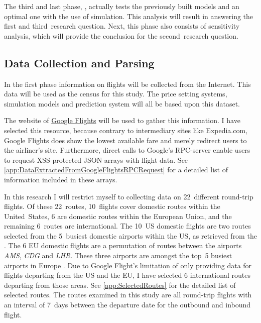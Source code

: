 The third and last phase, , actually tests the previously built models and an optimal one with the use of simulation. This analysis will result in answering the first and third~research question. Next, this phase also consists of sensitivity analysis, which will provide the conclusion for the second~research question.

\subsection{Data Collection and Parsing}
\label{subsec:DataCollectionAndParsing}
In the first phase information on flights will be collected from the Internet. This data will be used as the census for this study. The price setting systems, simulation models and prediction system will all be based upon this dataset.

The website of \href{http://google.nl/flights}{Google Flights} will be used to gather this information. I have selected this resource, because contrary to intermediary sites like Expedia.com, Google Flights does show the lowest available fare and merely redirect users to the airliner's site. Furthermore, direct calls to Google's RPC-server enable users to request XSS-protected JSON-arrays with flight data. See \autoref{app:DataExtractedFromGoogleFlightsRPCRequest} for a detailed list of information included in these arrays.

In this research I will restrict myself to collecting data on 22~different round-trip flights. Of these 22~routes, 10~flights cover domestic routes within the United~States, 6 are domestic routes within the European Union, and the remaining 6~routes are international. The 10~US domestic flights are two routes selected from the 5~busiest domestic airports within the US, as retrieved from the . The 6 EU domestic flights are a permutation of routes between the airports \emph{AMS}, \emph{CDG} and \emph{LHR}. These three airports are amongst the top~5 busiest airports in Europe . Due to Google Flight's limitation of only providing data for flights departing from the US and the EU, I have selected 6 international routes departing from those areas. See \autoref{app:SelectedRoutes} for the detailed list of selected routes. The routes examined in this study are all round-trip flights with an interval of 7~days between the departure date for the outbound and inbound flight.

